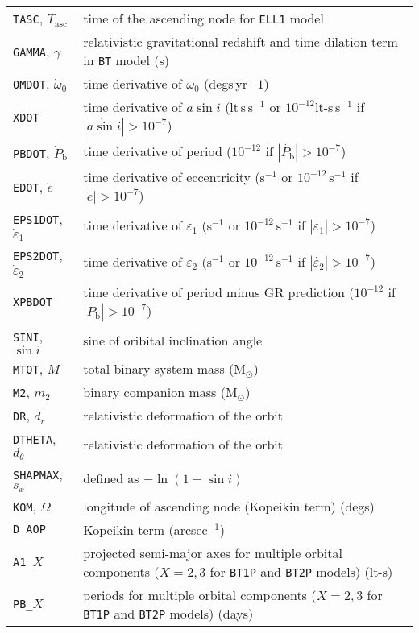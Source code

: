 \begin{longtable}{l|l}
{\tt TASC}, $T_{\text{asc}}$ & time of the ascending node for {\tt ELL1} model \citep[see Appendix in][]{2001MNRAS.326..274L} \\
{\tt GAMMA}, $\gamma$ & relativistic gravitational redshift and time dilation term in {\tt BT} model (s) \\
{\tt OMDOT}, $\dot{\omega}_0$ & time derivative of $\omega_0$ (degs\,yr${-1}$) \\
{\tt XDOT} & time derivative of $a\sin{i}$ (lt\,s\,s$^{-1}$ or $10^{-12}$lt-s\,s$^{-1}$ if $|\dot{a\sin{i}}| > 10^{-7}$)  \\
{\tt PBDOT}, $\dot{P}_{\text{b}}$ & time derivative of period ($10^{-12}$ if $|\dot{P_{\text{b}}}| > 10^{-7}$) \\
{\tt EDOT}, $\dot{e}$ & time derivative of eccentricity (s$^{-1}$ or $10^{-12}$\,s$^{-1}$ if $|\dot{e}| > 10^{-7}$) \\
{\tt EPS1DOT}, $\dot{\varepsilon}_1$ & time derivative of $\varepsilon_1$ (s$^{-1}$ or $10^{-12}$\,s$^{-1}$ if $|\dot{\varepsilon_1}| > 10^{-7}$) \\
{\tt EPS2DOT}, $\dot{\varepsilon}_2$ & time derivative of $\varepsilon_2$ (s$^{-1}$ or $10^{-12}$\,s$^{-1}$ if $|\dot{\varepsilon_2}| > 10^{-7}$) \\
{\tt XPBDOT} & time derivative of period minus GR prediction ($10^{-12}$ if $|\dot{P_{\text{b}}}| > 10^{-7}$) \\
{\tt SINI}, $\sin{i}$ & sine of oribital inclination angle \\
{\tt MTOT}, $M$ & total binary system mass (M$_{\odot}$) \\
{\tt M2}, $m_2$ & binary companion mass (M$_{\odot}$) \\
{\tt DR}, $d_r$ & relativistic deformation of the orbit \\
{\tt DTHETA}, $d_{\theta}$ & relativistic deformation of the orbit \\
{\tt SHAPMAX}, $s_x$ & defined as $-\ln{(1-\sin{i})}$ \\
{\tt KOM}, $\Omega$ & longitude of ascending node (Kopeikin term) (degs) \\
{\tt D\_AOP} & Kopeikin term (arcsec$^{-1}$) \citep[see e.g.\ Section~2.7.1 of][]{2006MNRAS.372.1549E} \\
{\tt A1\_}$X$ & projected semi-major axes for multiple orbital components ($X=2,3$ for {\tt BT1P} and {\tt BT2P} models) (lt-s) \\
{\tt PB\_}$X$ & periods for multiple orbital components ($X=2,3$ for {\tt BT1P} and {\tt BT2P} models) (days) \\

\end{longtable}
